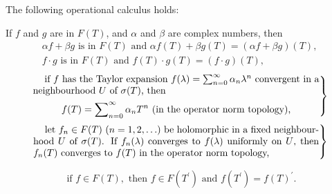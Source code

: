 The following operational calculus holds: 

\begin{theoremn} If $f$ and $g$ are in $F(T)$, and $\alpha$ and $\beta$ are complex numbers, then
\begin{gather}
\alpha f+\beta g\text{ is in }F(T)\text{ and }\alpha f(T)+\beta g(T)=(\alpha f+\beta g)(T),\label{eq:VIII.7.2}\\
f\cdot g\text{ is in }F(T)\text{ and }f(T)\cdot g(T)=(f\cdot g)(T),\label{eq:VIII.7.3}
\end{gather}
\begin{equation}\label{eq:VIII.7.4}
\left.\begin{gathered}
\parbox{0.86\linewidth}{\setlength{\parindent}{1.2em}\indent
if $f$ has the Taylor expansion $f(\lambda)=\sum\limits_{n=0}^{\infty}\alpha_n\lambda^n$ convergent in a neighbourhood $U$ of $\sigma(T)$, then}\vphantom{\sum}\mathstrut\\[2pt]
f(T)=\sum\limits_{n=0}^{\infty}\alpha_nT^n\text{ (in the operator norm topology),}
\end{gathered}\right\}
\end{equation}
\begin{equation}\label{eq:VIII.7.5}
\left.\begin{gathered}
\parbox{0.86\linewidth}{\setlength{\parindent}{1.2em}\indent
let $f_n\in F(T)$ $(n=1,2,\ldots)$ be holomorphic in a fixed neighbourhood $U$ of $\sigma(T)$. If $f_n(\lambda)$ converges to $f(\lambda)$ uniformly on $U$, then $f_n(T)$ converges to $f(T)$ in the operator norm topology,}
\end{gathered}\right\}
\end{equation}

\begin{equation}\label{eq:VIII.7.6}
\text{ if } f \in F (T), \text{ then } f \in F (T ^{\prime}) \text{ and } f (T ^{\prime}) = f (T) ^{\prime}.
\end{equation}

\end{theoremn}

